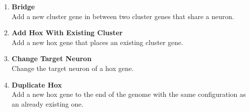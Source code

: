 \begin{enumerate}
    \item \textbf{Bridge} \\    
    Add a new cluster gene in between two cluster genes that share a neuron.
    
    \item \textbf{Add Hox With Existing Cluster} \\    
    Add a new hox gene that places an existing cluster gene.
    
    \item \textbf{Change Target Neuron} \\    
    Change the target neuron of a hox gene.
    
    \item \textbf{Duplicate Hox} \\    
    Add a new hox gene to the end of the genome with the same configuration as an already existing one.
    
\end{enumerate}

